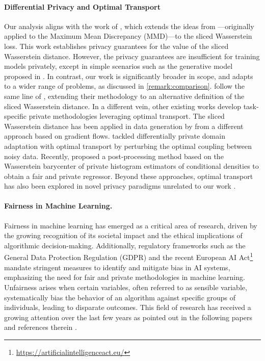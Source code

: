 \paragraph{Differential Privacy and Optimal Transport}
Our analysis aligns with the work of \cite{rakotomamonjy2021DPslicedWasserstein}, which extends the ideas from \cite{harder2021dp}—originally applied to the Maximum Mean Discrepancy (MMD)—to the sliced Wasserstein loss. This work establishes privacy guarantees for the value of the sliced Wasserstein distance. However, the privacy guarantees are insufficient for training models privately, except in simple scenarios such as the generative model proposed in \cite{harder2021dp}. In contrast, our work is significantly broader in scope, and adapts to a wider range of problems, as discussed in \cref{remark:comparison}. \cite{Liu_Yu} follow the same line of \cite{rakotomamonjy2021DPslicedWasserstein}, extending their methodology to an alternative definition of the sliced Wasserstein distance.  In a different vein, other existing works develop task-specific private methodologies leveraging optimal transport. The sliced Wasserstein distance has been applied in data generation by \cite{segag2023gradientFlow} from a different approach based on gradient flows. \cite{tien2019DPOTdomainAdapt} tackled differentially private domain adaptation with optimal transport by perturbing the optimal coupling between noisy data. Recently, \cite{xian2024DPfairRegression} proposed a post-processing method based on the Wasserstein barycenter of private histogram estimators of conditional densities to obtain a fair and private regressor. Beyond these approaches, optimal transport has also been explored in novel privacy paradigms unrelated to our work \cite{pierquin2024Pufferfish,Kawamoto2019localObfuscation,yang2024wassersteinDP}.
\paragraph{Fairness in Machine Learning.}
Fairness in machine learning has emerged as a critical area of research, driven  by the growing recognition of its societal impact and the ethical implications of algorithmic decision-making. Additionally, regulatory frameworks such as the General Data Protection Regulation (GDPR) and the recent European AI Act\footnote{\url{https://artificialintelligenceact.eu/}} mandate stringent measures to identify and mitigate bias in AI systems, emphasizing the need for fair and private methodologies in machine learning. Unfairness arises when certain variables, often referred to as sensible variable, systematically bias the behavior of an algorithm against specific groups of individuals, leading to disparate outcomes. This field of research has received a growing attention over the last few years as pointed out in the following papers and references therein \cite{chouldechova2020snapshot,dwork2012fairness,oneto2020fairness,wang2022brief,barocas2018fairness,besse2022survey}.

